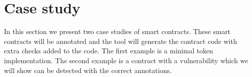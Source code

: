 \documentclass[a4paper]{article}
\begin{document}
\section{Case study}
In this section we present two case studies of smart contracts. These smart contracts will be annotated and the tool will generate the contract code with extra checks added to the code. The first example is a minimal token implementation. The second example is a contract with a vulnerability which we will show can be detected with the correct annotations.
\end{document}
